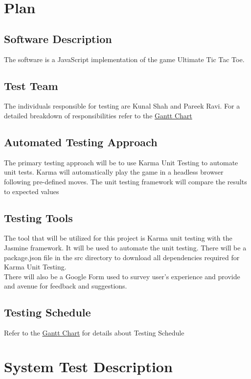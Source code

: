 \documentclass[12pt, titlepage]{article}
\begin{document}
\section{Plan}
	
\subsection{Software Description}
The software is a JavaScript implementation of the game Ultimate Tic Tac Toe. 

\subsection{Test Team}
The individuals responsible for testing are Kunal Shah and Pareek Ravi. For a
detailed breakdown of responsibilities refer to the
\href{run:../../ProjectSchedule/Gantt Chart.gan}{Gantt Chart}

\subsection{Automated Testing Approach}
The primary testing approach will be to use Karma Unit Testing to automate unit
tests. Karma will automatically play the game in a headless browser following
pre-defined moves. The unit testing framework will compare the results to
expected values

\subsection{Testing Tools}
The tool that will be utilized for this project is Karma unit testing with the
Jasmine framework. It will be used to automate the unit testing. There will be a
package.json file in the src directory to download all dependencies required for
Karma Unit Testing.\\
There will also be a Google Form used to survey user's experience and provide
and avenue for feedback and suggestions.

\subsection{Testing Schedule}	
Refer to the \href{run:../../ProjectSchedule/Gantt Chart.gan}{Gantt Chart} for
details about Testing Schedule

\section{System Test Description}
	
\end{document}
